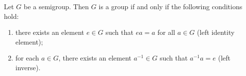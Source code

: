 \begin{proposition}
Let $G$ be a semigroup. Then $G$ is a group if and only if the following conditions hold:
\begin{enumerate}
    \item[(i)] there exists an element $e \in G$ such that $ea = a$ for all $a \in G$ (left identity element);
    \item[(ii)] for each $a \in G$, there exists an element $a^{-1} \in G$ such that $a^{-1}a = e$ (left inverse).
\end{enumerate}
\end{proposition}
